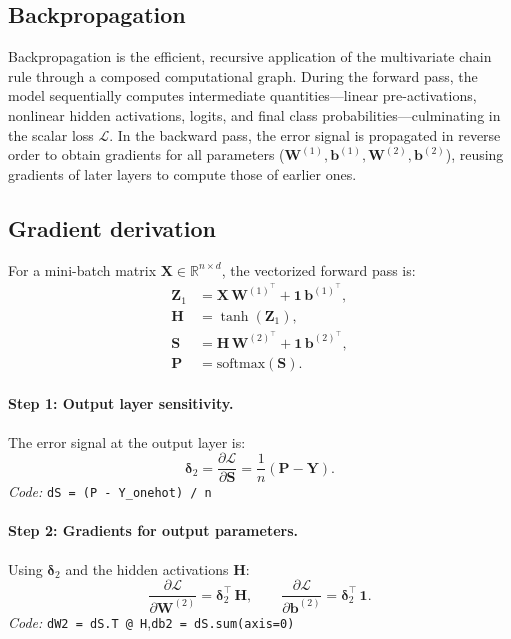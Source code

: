 \documentclass[sigconf,screen,nonacm]{acmart}
\newcommand{\vone}{\mathbf{1}}
\newcommand{\vbone}{\mathbf{b}^{(1)}}
\newcommand{\vbtwo}{\mathbf{b}^{(2)}}
\newcommand{\mWone}{\mathbf{W}^{(1)}}
\newcommand{\mWtwo}{\mathbf{W}^{(2)}}
\newcommand{\mX}{\mathbf{X}}
\newcommand{\mH}{\mathbf{H}}
\newcommand{\mS}{\mathbf{S}}
\newcommand{\mP}{\mathbf{P}}
\newcommand{\mY}{\mathbf{Y}}
\newcommand{\mZ}{\mathbf{Z}}
\newcommand{\R}{\mathbb{R}}
\newcommand{\loss}{\mathcal{L}}
\begin{document}
\subsection{Backpropagation}
Backpropagation is the efficient, recursive application of the multivariate chain rule through a composed computational graph. During the forward pass, the model sequentially computes intermediate quantities---linear pre-activations, nonlinear hidden activations, logits, and final class probabilities---culminating in the scalar loss $\loss$. In the backward pass, the error signal is propagated in reverse order to obtain gradients for all parameters ($\mWone, \vbone, \mWtwo, \vbtwo$), reusing gradients of later layers to compute those of earlier ones.

\subsection{Gradient derivation}
For a mini-batch matrix $\mX \in \R^{n \times d}$, the vectorized forward pass is:
\begin{align}
    \mZ_{1} &= \mX\,\mWone^{\top} + \vone\,\vbone^{\top}, \\
    \mH     &= \tanh(\mZ_{1}), \\
    \mS     &= \mH\,\mWtwo^{\top} + \vone\,\vbtwo^{\top}, \\
    \mP     &= \mathrm{softmax}(\mS).
\end{align}

\paragraph{Step 1: Output layer sensitivity.}
The error signal at the output layer is:
\begin{equation}
\boldsymbol{\delta}_{2} = \frac{\partial \loss}{\partial \mS} = \frac{1}{n}(\mP - \mY).
\end{equation}
\textit{Code:} \texttt{dS = (P - Y\_onehot) / n}

\paragraph{Step 2: Gradients for output parameters.}
Using $\boldsymbol{\delta}_{2}$ and the hidden activations $\mH$:
\begin{equation}
\frac{\partial \loss}{\partial \mWtwo} = \boldsymbol{\delta}_{2}^{\top}\,\mH,
\qquad
\frac{\partial \loss}{\partial \vbtwo} = \boldsymbol{\delta}_{2}^{\top}\,\vone.
\end{equation}
\textit{Code:} \texttt{dW2 = dS.T @ H},\quad \texttt{db2 = dS.sum(axis=0)}
\end{document}
